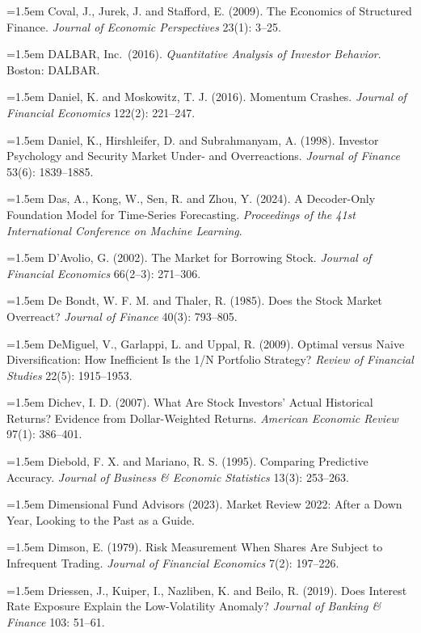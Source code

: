 \hangindent=1.5em Coval, J., Jurek, J. and Stafford, E. (2009). The Economics of Structured Finance. \emph{Journal of Economic Perspectives} 23(1): 3--25.

\hangindent=1.5em DALBAR, Inc.\ (2016). \emph{Quantitative Analysis of Investor Behavior}. Boston: DALBAR.

\hangindent=1.5em Daniel, K. and Moskowitz, T. J. (2016). Momentum Crashes. \emph{Journal of Financial Economics} 122(2): 221--247.

\hangindent=1.5em Daniel, K., Hirshleifer, D. and Subrahmanyam, A. (1998). Investor Psychology and Security Market Under- and Overreactions. \emph{Journal of Finance} 53(6): 1839--1885.

\hangindent=1.5em Das, A., Kong, W., Sen, R. and Zhou, Y. (2024). A Decoder-Only Foundation Model for Time-Series Forecasting. \emph{Proceedings of the 41st International Conference on Machine Learning}.

\hangindent=1.5em D'Avolio, G. (2002). The Market for Borrowing Stock. \emph{Journal of Financial Economics} 66(2--3): 271--306.

\hangindent=1.5em De Bondt, W. F. M. and Thaler, R. (1985). Does the Stock Market Overreact? \emph{Journal of Finance} 40(3): 793--805.

\hangindent=1.5em DeMiguel, V., Garlappi, L. and Uppal, R. (2009). Optimal versus Naive Diversification: How Inefficient Is the 1/N Portfolio Strategy? \emph{Review of Financial Studies} 22(5): 1915--1953.

\hangindent=1.5em Dichev, I. D. (2007). What Are Stock Investors' Actual Historical Returns? Evidence from Dollar-Weighted Returns. \emph{American Economic Review} 97(1): 386--401.

\hangindent=1.5em Diebold, F. X. and Mariano, R. S. (1995). Comparing Predictive Accuracy. \emph{Journal of Business \& Economic Statistics} 13(3): 253--263.

\hangindent=1.5em Dimensional Fund Advisors (2023). Market Review 2022: After a Down Year, Looking to the Past as a Guide.

\hangindent=1.5em Dimson, E. (1979). Risk Measurement When Shares Are Subject to Infrequent Trading. \emph{Journal of Financial Economics} 7(2): 197--226.

\hangindent=1.5em Driessen, J., Kuiper, I., Nazliben, K. and Beilo, R. (2019). Does Interest Rate Exposure Explain the Low-Volatility Anomaly? \emph{Journal of Banking \& Finance} 103: 51--61.

